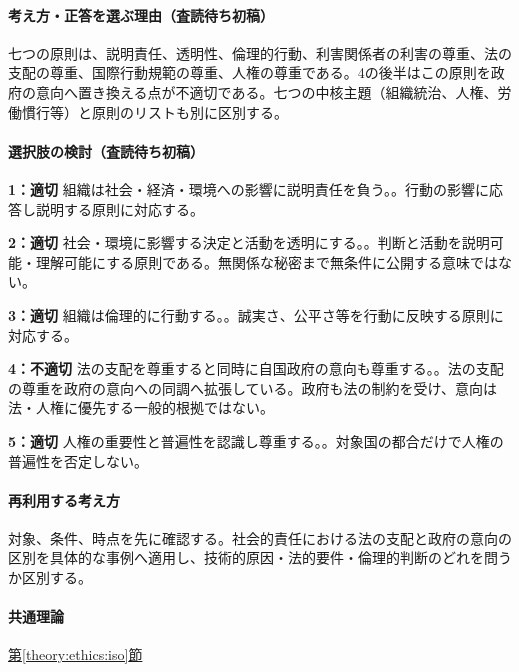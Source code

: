 \paragraph{考え方・正答を選ぶ理由（査読待ち初稿）} 七つの原則は、説明責任、透明性、倫理的行動、利害関係者の利害の尊重、法の支配の尊重、国際行動規範の尊重、人権の尊重である。4の後半はこの原則を政府の意向へ置き換える点が不適切である。七つの中核主題（組織統治、人権、労働慣行等）と原則のリストも別に区別する。

\paragraph{選択肢の検討（査読待ち初稿）}\mbox{}\par

\noindent\textbf{1：適切} 組織は社会・経済・環境への影響に説明責任を負う。。行動の影響に応答し説明する原則に対応する。\par

\noindent\textbf{2：適切} 社会・環境に影響する決定と活動を透明にする。。判断と活動を説明可能・理解可能にする原則である。無関係な秘密まで無条件に公開する意味ではない。\par

\noindent\textbf{3：適切} 組織は倫理的に行動する。。誠実さ、公平さ等を行動に反映する原則に対応する。\par

\noindent\textbf{4：不適切} 法の支配を尊重すると同時に自国政府の意向も尊重する。。法の支配の尊重を政府の意向への同調へ拡張している。政府も法の制約を受け、意向は法・人権に優先する一般的根拠ではない。\par

\noindent\textbf{5：適切} 人権の重要性と普遍性を認識し尊重する。。対象国の都合だけで人権の普遍性を否定しない。\par

\paragraph{再利用する考え方} 対象、条件、時点を先に確認する。社会的責任における法の支配と政府の意向の区別を具体的な事例へ適用し、技術的原因・法的要件・倫理的判断のどれを問うか区別する。

\paragraph{共通理論} \hyperref[theory:ethics:iso]{第\ref*{theory:ethics:iso}節}

